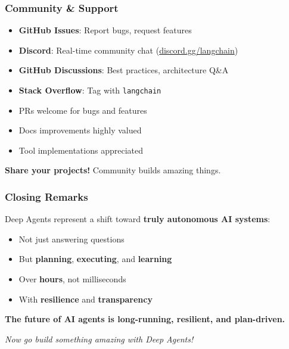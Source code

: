 \documentclass[aspectratio=169,11pt]{beamer}
\begin{document}
\begin{frame}[fragile]
\frametitle{Community \& Support}

\begin{tipbox}
\begin{itemize}
    \setlength{\itemsep}{1pt}
  \item \textbf{GitHub Issues}: Report bugs, request features
  \item \textbf{Discord}: Real-time community chat (\url{discord.gg/langchain})
  \item \textbf{GitHub Discussions}: Best practices, architecture Q\&A
  \item \textbf{Stack Overflow}: Tag with \texttt{langchain}
\end{itemize}
\end{tipbox}

\begin{tipbox}[Contributing]
\begin{itemize}
    \setlength{\itemsep}{1pt}
  \item PRs welcome for bugs and features
  \item Docs improvements highly valued
  \item Tool implementations appreciated
\end{itemize}
\end{tipbox}

\vspace{1em}
\textcolor{lcblue}{\textbf{Share your projects!}} Community builds amazing things.

\end{frame}

\begin{frame}[fragile]
\frametitle{Closing Remarks}

\begin{conceptbox}
Deep Agents represent a shift toward \textbf{truly autonomous AI systems}:
\begin{itemize}
    \setlength{\itemsep}{1pt}
  \item Not just answering questions
  \item But \textbf{planning}, \textbf{executing}, and \textbf{learning}
  \item Over \textbf{hours}, not milliseconds
  \item With \textbf{resilience} and \textbf{transparency}
\end{itemize}
\end{conceptbox}

\vspace{1em}
\begin{center}
\textcolor{lcblue}{\Large \textbf{The future of AI agents is long-running, resilient, and plan-driven.}}
\end{center}

\vspace{1em}
\begin{center}
\textit{Now go build something amazing with Deep Agents!}
\end{center}

\end{frame}
\end{document}
